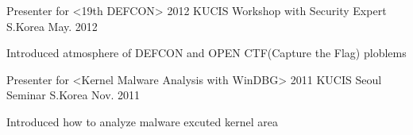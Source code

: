 \begin{cventries}
  \cventry
    {Presenter for <19th DEFCON>}
    {2012 KUCIS Workshop with Security Expert}
    {S.Korea}
    {May. 2012}
    {
      \begin{cvitems}
        \item {Introduced atmosphere of DEFCON and OPEN CTF(Capture the Flag) ploblems}
      \end{cvitems}
    }
  \cventry
    {Presenter for <Kernel Malware Analysis with WinDBG>}
    {2011 KUCIS Seoul Seminar}
    {S.Korea}
    {Nov. 2011}
    {
      \begin{cvitems}
        \item {Introduced how to analyze malware excuted kernel area}
      \end{cvitems}
    }
\end{cventries}
